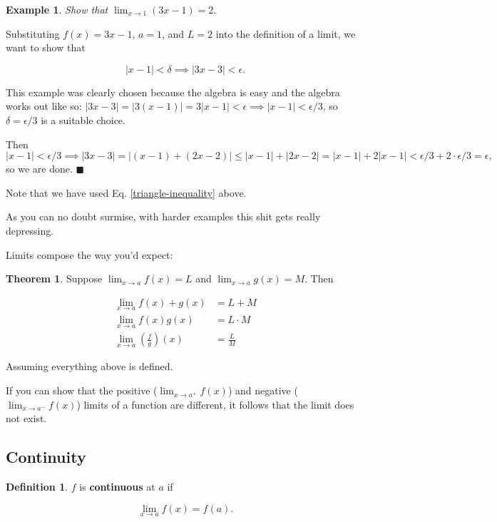 \documentclass{article}
\theoremstyle{definition}
\newtheorem{definition}{Definition}
\newtheorem{example}{Example}
\newtheorem{theorem}{Theorem}
\begin{document}
\begin{example} 

\emph{Show that $\lim_{x \to 1} (3x-1) = 2$}.

Substituting $f(x) = 3x-1$, $a = 1$, and $L = 2$ into the definition of a limit,
we want to show that

\begin{equation}
|x - 1| < \delta \implies |3x - 3| < \epsilon.
\end{equation}

This example was clearly chosen because the algebra is easy and the algebra
works out like so: $|3x-3| = |3(x-1)| = 3|x-1| < \epsilon \implies |x-1| <
\epsilon/3$, so $\delta = \epsilon/3$ is a suitable choice.

Then $|x - 1| < \epsilon/3 \implies |3x-3| = |(x - 1) + (2x-2)| \leq |x-1| +
|2x-2| = |x-1| + 2|x-1| < \epsilon/3 + 2 \cdot \epsilon/3 = \epsilon,$ so we are
done. $\blacksquare$

Note that we have used Eq. \ref{triangle-inequality} above.
 
\end{example}

As you can no doubt surmise, with harder examples this shit gets really depressing.

Limits compose the way you'd expect:
\begin{theorem}
Suppose $\lim_{x \to a} f(x) = L$ and $\lim_{x \to a} g(x) = M$. Then

\begin{align}
\lim_{x \to a} f(x) + g(x) & = L + M \\
\lim_{x \to a} f(x)g(x) & = L \cdot M \\
\lim_{x \to a} \left(\frac{f}{g}\right)(x) & = \frac{L}{M}
\end{align}

Assuming everything above is defined.

\end{theorem}

If you can show that the positive ($\lim_{x \to a^{+}} f(x)$) and negative
($\lim_{x \to a^{-}} f(x) $) limits of a function are
different, it follows that the limit does not exist.


\subsection{Continuity}

\begin{definition}

$f$ is \textbf{continuous} at $a$ if

\begin{equation}
\lim_{x \to a} f(x) = f(a).
\end{equation}

\end{definition}
\end{document}
